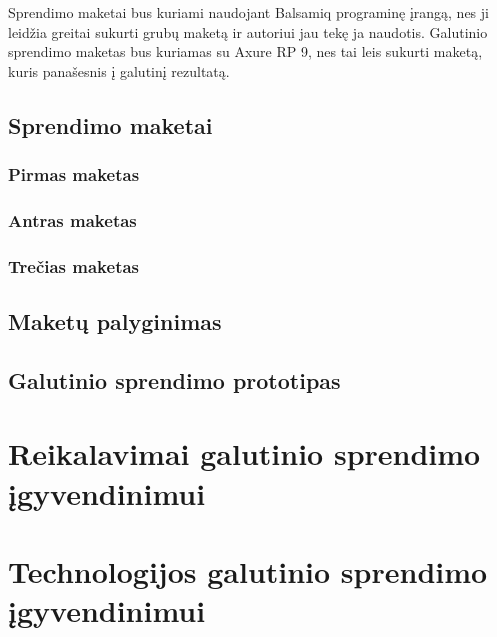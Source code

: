 \documentclass{VUMIFPSkursinis}
\begin{document}
Sprendimo maketai bus kuriami naudojant Balsamiq programinę įrangą, nes ji leidžia greitai sukurti grubų maketą ir autoriui jau tekę ja naudotis. Galutinio sprendimo maketas bus kuriamas su Axure RP 9, nes tai leis sukurti maketą, kuris panašesnis į galutinį rezultatą.

\subsection{Sprendimo maketai}
\subsubsection{Pirmas maketas}

\subsubsection{Antras maketas}
\subsubsection{Trečias maketas}

\subsection{Maketų palyginimas}
\subsection{Galutinio sprendimo prototipas}

\section{Reikalavimai galutinio sprendimo įgyvendinimui}
\section{Technologijos galutinio sprendimo įgyvendinimui}




\printbibliography[heading=bibintoc, title=Šaltiniai]  %
\end{document}
